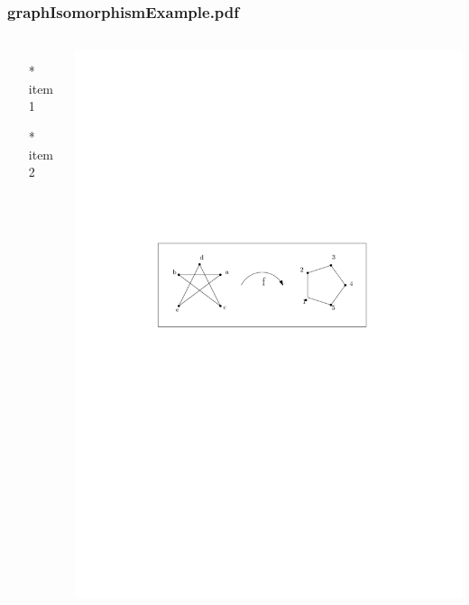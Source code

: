 \begin{frame} \frametitle{graphIsomorphismExample.pdf}
    \begin{columns}[c]
        \begin{itemize}
            \item[*] item 1
            \item[*] item 2
        \end{itemize}
        \begin{minipage}{\linewidth}
            \begin{center}
            \includegraphics[width=.9\textwidth]{graphics/graphIsomorphismExample.pdf}
            \label{gfx:graphIsomorphismExample.pdf}
            \end{center}
        \end{minipage}
    \end{columns}
\end{frame}
